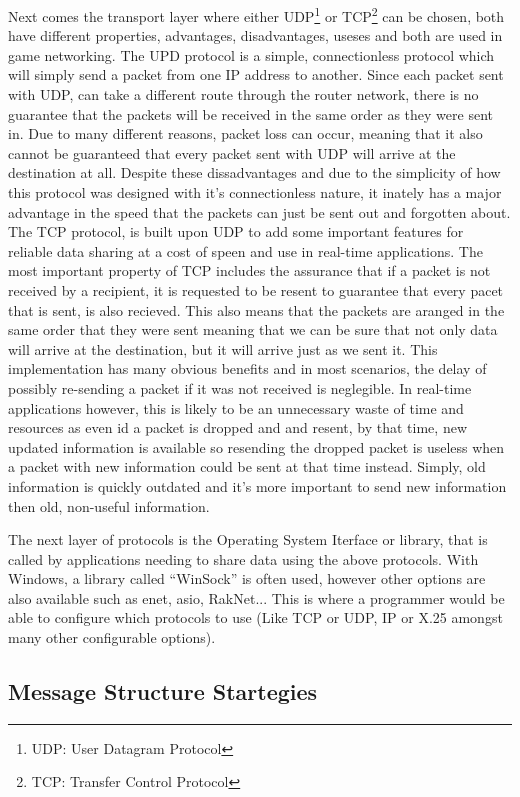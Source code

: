 Next comes the transport layer where either UDP\footnote{UDP: User Datagram Protocol} or TCP\footnote{TCP: Transfer Control Protocol}  can be chosen, both have different properties, advantages, disadvantages, useses and both are used in game networking. The UPD protocol is a simple, connectionless protocol which will simply send a packet from one IP address to another. Since each packet sent with UDP, can take a different route through the router network, there is no guarantee that the packets will be received in the same order as they were sent in. Due to many different reasons, packet loss can occur, meaning that it also cannot be guaranteed that every packet sent with UDP will arrive at the destination at all. Despite these dissadvantages and due to the simplicity of how this protocol was designed with it's connectionless nature, it inately has a major advantage in the speed that the packets can just be sent out and forgotten about. The TCP protocol, is built upon UDP to add some important features for reliable data sharing at a cost of speen and use in real-time applications. The most important property of TCP includes the assurance that if a packet is not received by a recipient, it is requested to be resent to guarantee that every pacet that is sent, is also recieved. This also means that the packets are aranged in the same order that they were sent meaning that we can be sure that not only data will arrive at the destination, but it will arrive just as we sent it. This implementation has many obvious benefits and in most scenarios, the delay of possibly re-sending a packet if it was not received is neglegible. In real-time applications however, this is likely to be an unnecessary waste of time and resources as even id a packet is dropped and and resent, by that time, new updated information is available so resending the dropped packet is useless when a packet with new information could be sent at that time instead. Simply, old information is quickly outdated and it's more important to send new information then old, non-useful information.

The next layer of protocols is the Operating System Iterface or library, that is called by applications needing to share data using the above protocols. With Windows, a library called ``WinSock'' is often used, however other options are also available such as enet, asio, RakNet... This is where a programmer would be able to configure which protocols to use (Like TCP or UDP, IP or X.25 amongst many other configurable options).


\subsection{Message Structure Startegies}


